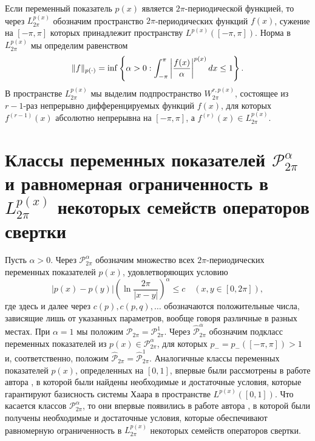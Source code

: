 
Если переменный показатель $p(x)$ является $2\pi$-периодической функцией, то через  $L_{2\pi}^{p(x)}$ обозначим пространство
$2\pi$-периодических функций $f(x)$, сужение на $[-\pi,\pi]$ которых принадлежит пространству $L^{p(x)}([-\pi,\pi])$. Норма в $L_{2\pi}^{p(x)}$ мы определим равенством
\begin{equation}\label{vpmshii3.1}
    \|f\|_{p(\cdot)}=\inf \left\{\alpha>0:   \int_{-\pi}^{\pi}\left|{f(x)\over\alpha}\right|^{p(x)}dx\le1\right\}.
\end{equation}
 В пространстве $L_{2\pi}^{p(x)}$ мы выделим подпространство $W_{2\pi}^{r,p(x)}$, состоящее из \\ $r-1$-раз непрерывно дифференцируемых функций $f(x)$, для которых $f^{(r-1)}(x)$ абсолютно непрерывна на $[-\pi,\pi]$, а $f^{(r)}(x)\in L_{2\pi}^{p(x)}$.




\section{Классы переменных показателей $\mathcal{ P}^\alpha_{2\pi}$ и равномерная ограниченность в $L_{2\pi}^{p(x)}$ некоторых семейств операторов свертки }\label{vpmshiis4}

Пусть $\alpha>0$. Через $\mathcal{ P}^\alpha_{2\pi}$ обозначим множество всех $2\pi$-периодических переменных показателей $p(x)$, удовлетворяющих условию
\begin{equation}\label{vpmshii4.1}
    |p(x)-p(y)|\left(\ln\frac{2\pi}{|x-y|}\right)^\alpha\le c \quad (x,y\in [0,2\pi]),
\end{equation}
где здесь и далее через $c(p),c(p,q), \ldots$ обозначаются положительные числа, зависящие лишь от указанных параметров, вообще говоря различные в разных местах. При $\alpha=1$ мы положим  $\mathcal{ P}_{2\pi}= \mathcal{ P}^1_{2\pi}$. Через  $\hat{\mathcal{ P}}^\alpha_{2\pi}$
обозначим подкласс переменных показателей из  $p(x)\in \mathcal{ P}^\alpha_{2\pi}$, для которых $p_-=p_-([-\pi,\pi])>1$ и, соответственно, положим  $\hat{\mathcal{ P}}_{2\pi}=\hat{\mathcal{ P}}^1_{2\pi}$. Аналогичные классы переменных показателей
$p(x)$, определенных на $[0,1]$, впервые были рассмотрены в работе автора \cite{vpmshiiShar1}, в которой были найдены необходимые и достаточные условия, которые гарантируют базисность системы Хаара в пространстве $L^{p(x)}([0,1])$. Что касается классов  $\mathcal{ P}^\alpha_{2\pi}$,
то они впервые появились в работе автора \cite{vpmshiiShar5}, в которой были получены необходимые и достаточные условия, которые обеспечивают
равномерную ограниченность в $L_{2\pi}^{p(x)}$ некоторых семейств операторов свертки.

